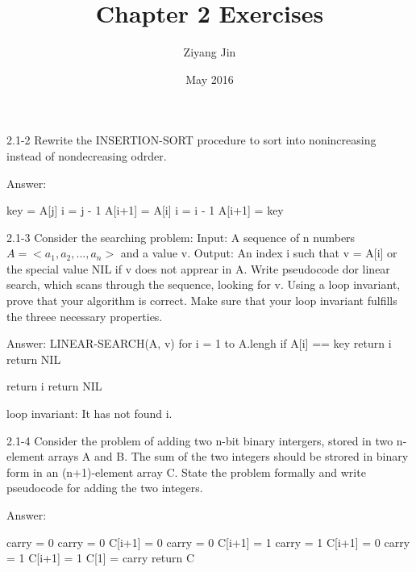 \documentclass{article}
\title{Chapter 2 Exercises}
\author{Ziyang Jin}
\date{May 2016}
\begin{document}
2.1-2
Rewrite the INSERTION-SORT procedure to sort into nonincreasing instead of nondecreasing odrder.

Answer:
\begin{algorithm}
\begin{algorithmic}[1]
    \State key = A[j]
    \State i = j - 1
        \State A[i+1] = A[i]
        \State i = i - 1
    \EndWhile
    \State A[i+1] = key
\EndFor
\EndProcedure
\end{algorithmic}
\end{algorithm}
    
2.1-3
Consider the searching problem:
  Input: A sequence of n numbers $A = <a_1, a_2, ..., a_n>$ and a value v.
  Output: An index i such that v = A[i] or the special value NIL if v does not apprear in A.
Write pseudocode dor linear search, which scans through the sequence, looking for v. Using a loop invariant, prove that your algorithm is correct. Make sure that your loop invariant fulfills the threee necessary properties.

Answer:
LINEAR-SEARCH(A, v)
  for i = 1 to A.lengh
    if A[i] == key
      return i
  return NIL

\begin{algorithm}
\begin{algorithmic}[1]
        \State return i
    \EndIf
\EndFor
\State return NIL
\EndProcedure
\end{algorithmic}
\end{algorithm}
  
loop invariant: It has not found i.
  
2.1-4
Consider the problem of adding two n-bit binary intergers, stored in two n-element arrays A and B. The sum of the two integers should be strored in binary form in an (n+1)-element array C. State the problem formally and write pseudocode for adding the two integers.

Answer:

\begin{algorithm}
\begin{algorithmic}[1]
\State carry = 0
        \State carry = 0
        \State C[i+1] = 0
        \State carry = 0
        \State C[i+1] = 1
       \State carry = 1
       \State C[i+1] = 0
    \Else
        \State carry = 1
        \State C[i+1] = 1
    \EndIf
\EndFor
\State C[1] = carry
\State return C
\EndProcedure
\end{algorithmic}
\end{algorithm}
\end{document}
